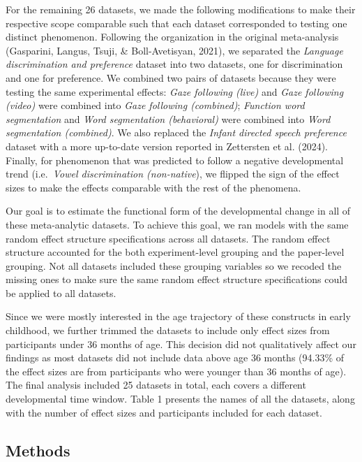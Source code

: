 \documentclass[
  man]{apa6}
\begin{document}
For the remaining 26 datasets, we made the following modifications to make their respective scope comparable such that each dataset corresponded to testing one distinct phenomenon. Following the organization in the original meta-analysis (Gasparini, Langus, Tsuji, \& Boll-Avetisyan, 2021), we separated the \emph{Language discrimination and preference} dataset into two datasets, one for discrimination and one for preference. We combined two pairs of datasets because they were testing the same experimental effects: \emph{Gaze following (live)} and \emph{Gaze following (video)} were combined into \emph{Gaze following (combined)}; \emph{Function word segmentation} and \emph{Word segmentation (behavioral)} were combined into \emph{Word segmentation (combined)}. We also replaced the \emph{Infant directed speech preference} dataset with a more up-to-date version reported in Zettersten et al. (2024). Finally, for phenomenon that was predicted to follow a negative developmental trend (i.e.~\emph{Vowel discrimination (non-native}), we flipped the sign of the effect sizes to make the effects comparable with the rest of the phenomena.

Our goal is to estimate the functional form of the developmental change in all of these meta-analytic datasets. To achieve this goal, we ran models with the same random effect structure specifications across all datasets. The random effect structure accounted for the both experiment-level grouping and the paper-level grouping. Not all datasets included these grouping variables so we recoded the missing ones to make sure the same random effect structure specifications could be applied to all datasets.

Since we were mostly interested in the age trajectory of these constructs in early childhood, we further trimmed the datasets to include only effect sizes from participants under 36 months of age. This decision did not qualitatively affect our findings as most datasets did not include data above age 36 months (94.33\% of the effect sizes are from participants who were younger than 36 months of age). The final analysis included 25 datasets in total, each covers a different developmental time window. Table 1 presents the names of all the datasets, along with the number of effect sizes and participants included for each dataset.

\hypertarget{methods}{%
\subsection{Methods}\label{methods}}
\end{document}
